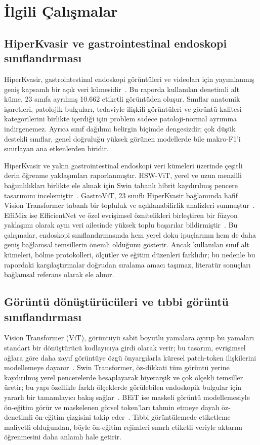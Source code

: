 \section{İlgili Çalışmalar}
\label{sec:related}

\subsection{HiperKvasir ve gastrointestinal endoskopi sınıflandırması}

HiperKvasir, gastrointestinal endoskopi görüntüleri ve videoları için yayımlanmış
geniş kapsamlı bir açık veri kümesidir~\cite{borgli2020hyperkvasir}. Bu raporda
kullanılan denetimli alt küme, 23 sınıfa ayrılmış 10.662 etiketli görüntüden oluşur.
Sınıflar anatomik işaretleri, patolojik bulguları, tedaviyle ilişkili görüntüleri ve
görüntü kalitesi kategorilerini birlikte içerdiği için problem sadece patoloji-normal
ayrımına indirgenemez. Ayrıca sınıf dağılımı belirgin biçimde dengesizdir; çok düşük
destekli sınıflar, genel doğruluğu yüksek görünen modellerde bile makro-F1'i sınırlayan
ana etkenlerden biridir.

HiperKvasir ve yakın gastrointestinal endoskopi veri kümeleri üzerinde çeşitli derin
öğrenme yaklaşımları raporlanmıştır. HSW-ViT, yerel ve uzun menzilli bağımlılıkları
birlikte ele almak için Swin tabanlı hibrit kaydırılmış pencere tasarımını
incelemiştir~\cite{wang2023hswvit}. GastroViT, 23 sınıflı HiperKvasir bağlamında
hafif Vision Transformer tabanlı bir topluluk ve açıklanabilirlik analizleri
sunmuştur~\cite{gastrovit2025}. EffiMix ise EfficientNet ve özel evrişimsel
öznitelikleri birleştiren bir füzyon yaklaşımı olarak aynı veri ailesinde yüksek
toplu başarılar bildirmiştir~\cite{ramamurthy2022effimix}. Bu çalışmalar, endoskopi
sınıflandırmasında hem yerel doku ipuçlarının hem de daha geniş bağlamsal temsillerin
önemli olduğunu gösterir. Ancak kullanılan sınıf alt kümeleri, bölme protokolleri,
ölçütler ve eğitim düzenleri farklıdır; bu nedenle bu rapordaki karşılaştırmalar
doğrudan sıralama amacı taşımaz, literatür sonuçları bağlamsal referans olarak ele
alınır.

\subsection{Görüntü dönüştürücüleri ve tıbbi görüntü sınıflandırması}

Vision Transformer (ViT), görüntüyü sabit boyutlu yamalara ayırıp bu yamaları standart
bir dönüştürücü kodlayıcıya girdi olarak verir; bu tasarım, evrişimsel ağlara göre daha
zayıf görüntüye özgü önyargılarla küresel patch-token ilişkilerini modellemeye
dayanır~\cite{dosovitskiy2021vit}. Swin Transformer, öz-dikkati tüm görüntü yerine
kaydırılmış yerel pencerelerde hesaplayarak hiyerarşik ve çok ölçekli temsiller üretir;
bu yapı özellikle farklı ölçeklerde görülebilen endoskopik bulgular için yararlı bir
tamamlayıcı bakış sağlar~\cite{liu2021swin}. BEiT ise maskeli görüntü modellemesiyle
ön-eğitim görür ve maskelenen görsel token'ları tahmin etmeye dayalı öz-denetimli
ön-eğitim çizgisini takip eder~\cite{bao2022beit}. Tıbbi görüntülemede etiketleme
maliyetli olduğundan, böyle ön-eğitim rejimleri sınırlı etiketli veriyle aktarım
öğrenmesini daha anlamlı hale getirir.

